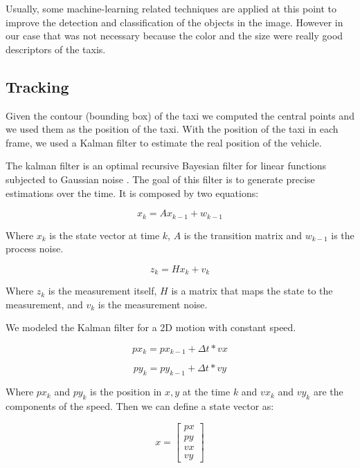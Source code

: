 \documentclass[journal]{IEEEtran}
\begin{document}
Usually, some machine-learning related techniques are applied at this point
to improve the detection and classification of the objects in the image.
However in our case that was not necessary because the color and the size
were really good descriptors of the taxis.

\subsection{Tracking}

Given the contour (bounding box) of the taxi we computed the central points
\cite{opencv:moments} and we used them as the position of the taxi. With the 
position of the taxi in each frame, we used a Kalman filter to estimate
the real position of the vehicle.

The kalman filter is an optimal recursive Bayesian filter for linear functions
subjected to Gaussian noise \cite{wiki:kalman}. The goal of this filter is to 
generate precise estimations over the time. It is composed by two equations:

\begin{equation}
  x_{k} = Ax_{k - 1} + w_{k - 1}
\end{equation}

Where $x_{k}$ is the state vector at time $k$, $A$ is the transition matrix
and $w_{k - 1}$ is the process noise.


\begin{equation}
  z_{k} = Hx_{k} + v_{k}
\end{equation}

Where $z_{k}$ is the measurement itself, $H$ is a matrix that maps the state to 
the measurement, and $v_{k}$ is the measurement noise.

We modeled the Kalman filter for a 2D motion with
constant speed.

\begin{equation}
  px_{k} = px_{k - 1} + {\Delta}t * vx
\end{equation}

\begin{equation}
  py_{k} = py_{k - 1} + {\Delta}t * vy
\end{equation}

Where $px_{k}$ and $py_{k}$  is the position in $x, y$ at the time $k$ and
$vx_{k}$ and $vy_{k}$ are the components of the speed. Then we can define a state
vector as:

\begin{equation}
  x = 
  \begin{bmatrix}
      px \\
      py \\
      vx \\
      vy
  \end{bmatrix}
\end{equation}
\end{document}

